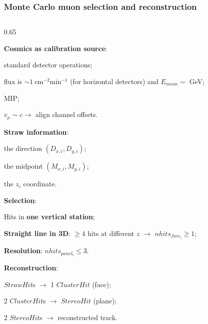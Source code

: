 \documentclass{beamer}
\begin{document}
\begin{frame}
    \frametitle{Monte Carlo muon selection and reconstruction}
\vspace{-4.6mm}
    \begin{columns}
\begin{column}{0.65\framewidth}
   \setlength{\leftmargini}{1.2em}
      \begin{itemize}
      {\small \item \textbf{Cosmics as calibration source}:}
      \vspace{-1mm}
      \begin{itemize}
    {\small \item standard detector operations;
    \item flux is $\sim 1 \ \text{cm}^{-2} \text{min}^{-1}$ 
    (for horizontal detectors) and $E_{mean}\sim$ GeV;
    \item MIP;
    \item $v_{\mu}\sim c \rightarrow$ align channel offsets.}
\end{itemize}
{\small \item \textbf{Straw information}:}
\vspace{-1mm}
\begin{itemize}
    {\small \item the direction $(D_{x,i},D_{y,i})$;
    \item the midpoint $(M_{x,i},M_{y,i})$;
    \item the $z_i$ coordinate.}
\end{itemize} 
 {\small
 \item \textbf{Selection}:}
 \vspace{-1mm}
  \begin{itemize}
   {\small \item  Hits in \textbf{one vertical station};
    \item \textbf{Straight line in 3D}: $\geq$4 hits at different $z$ $\rightarrow$ $nhits_{face_i}\geq 1$;
    \item \textbf{Resolution}: $nhits_{panel_i}\leq 3$.}
    \end{itemize} 
 {\small \item \textbf{Reconstruction}: }
 \vspace{-1mm}
        \begin{itemize}
        {\small \item $StrawHit$s $\rightarrow$ 1 $ClusterHit$ (face);
          \item 2 $ClusterHit$s $\rightarrow$ $StereoHit$ (plane);
          \item 2 $StereoHit$s $\rightarrow$ reconstructed track.}
        \end{itemize}


\end{itemize}
\end{column}
\end{columns}
\end{frame}
\end{document}
